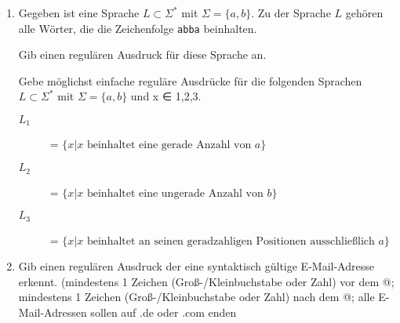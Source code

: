 \documentclass{lehramt-informatik-aufgabe}
\begin{document}
\begin{enumerate}
\item Gegeben ist eine Sprache $L \subset \Sigma^*$ mit $\Sigma =
\{a,b\}$. Zu der Sprache $L$ gehören alle Wörter, die die Zeichenfolge
\texttt{abba} beinhalten.

Gib einen regulären Ausdruck für diese Sprache an.

Gebe möglichst einfache reguläre Ausdrücke für die folgenden
Sprachen $L \subset \Sigma^*$ mit $\Sigma = \{a,b\}$ und x ∈ {1,2,3}.

\begin{description}
\item[$L_1$] = $\{ x | x \text{ beinhaltet eine gerade Anzahl von } a \}$

\item[$L_2$] = $\{ x | x \text{ beinhaltet eine ungerade Anzahl von } b \}$

\item[$L_3$] = $\{ x | x \text{ beinhaltet an seinen geradzahligen Positionen ausschließlich } a \}$
\end{description}

\item Gib einen regulären Ausdruck der eine syntaktisch gültige
E-Mail-Adresse erkennt. (mindestens 1 Zeichen (Groß-/Kleinbuchstabe oder
Zahl) vor dem @; mindestens 1 Zeichen (Groß-/Kleinbuchstabe oder Zahl)
nach dem @; alle E-Mail-Adressen sollen auf .de oder .com enden
\end{enumerate}
\end{document}
